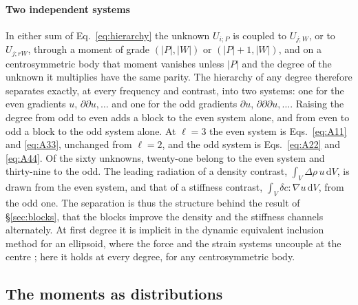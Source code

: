 \documentclass[preprint,review,12pt]{elsarticle}
\newcommand{\dd}{\mathrm{d}}
\begin{document}
\paragraph{Two independent systems} In either sum of Eq.~\eqref{eq:hierarchy} the unknown
$U_{i;P}$ is coupled to $U_{j;W}$, or to $U_{j;rW}$, through a moment of grade $(|P|,|W|)$ or
$(|P|+1,|W|)$, and on a centrosymmetric body that moment vanishes unless $|P|$ and the degree of the
unknown it multiplies have the same parity. The hierarchy of any degree therefore separates exactly,
at every frequency and contrast, into two systems: one for the even gradients $u$,
$\partial\partial u,\dots$ and one for the odd gradients $\partial u$, $\partial\partial\partial
u,\dots$. Raising the degree from odd to even adds a block to the even system alone, and from even to
odd a block to the odd system alone. At $\ell=3$ the even system is Eqs.~\eqref{eq:A11} and
\eqref{eq:A33}, unchanged from $\ell=2$, and the odd system is Eqs.~\eqref{eq:A22} and \eqref{eq:A44}.
Of the sixty unknowns, twenty-one belong to the even system and thirty-nine to the odd. The leading radiation of a density contrast,
$\int_V\Delta\rho\,u\,\dd V$, is drawn from the even system, and that of a stiffness contrast,
$\int_V\delta c:\nabla u\,\dd V$, from the odd one. The separation is thus the structure behind the
result of \S\ref{sec:blocks}, that the blocks improve the density and the stiffness channels
alternately. At first degree it is implicit in the dynamic equivalent inclusion method for an
ellipsoid, where the force and the strain systems uncouple at the centre \citep{FuMura1983}; here it
holds at every degree, for any centrosymmetric body.

\subsection{The moments as distributions}\label{sec:distributions}
\end{document}
